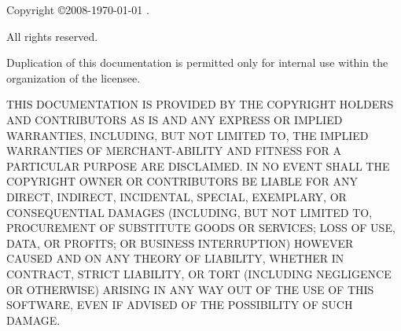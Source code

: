 
Copyright \copyright 2008-{\theyear\today} \company.

All rights reserved.

Duplication of this documentation is permitted
only for internal use within the organization of the licensee.

THIS DOCUMENTATION IS PROVIDED BY THE COPYRIGHT
HOLDERS AND CONTRIBUTORS \textquotedbl{}AS IS\textquotedbl{} AND ANY
EXPRESS OR IMPLIED WARRANTIES, INCLUDING, BUT NOT LIMITED TO, THE
IMPLIED WARRANTIES OF MERCHANT-ABILITY AND FITNESS FOR A PARTICULAR
PURPOSE ARE DISCLAIMED. IN NO EVENT SHALL THE COPYRIGHT OWNER OR CONTRIBUTORS
BE LIABLE FOR ANY DIRECT, INDIRECT, INCIDENTAL, SPECIAL, EXEMPLARY,
OR CONSEQUENTIAL DAMAGES (INCLUDING, BUT NOT LIMITED TO, PROCUREMENT
OF SUBSTITUTE GOODS OR SERVICES; LOSS OF USE, DATA, OR PROFITS; OR
BUSINESS INTERRUPTION) HOWEVER CAUSED AND ON ANY THEORY OF LIABILITY,
WHETHER IN CONTRACT, STRICT LIABILITY, OR TORT (INCLUDING NEGLIGENCE
OR OTHERWISE) ARISING IN ANY WAY OUT OF THE USE OF THIS SOFTWARE,
EVEN IF ADVISED OF THE POSSIBILITY OF SUCH DAMAGE.



